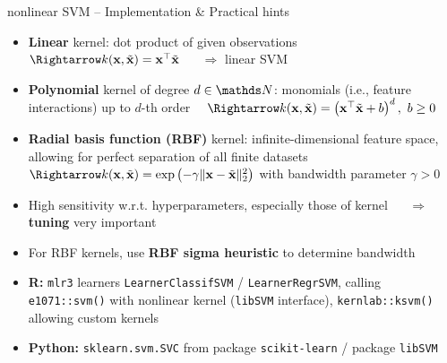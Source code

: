 \begin{frame}{nonlinear SVM -- Implementation \& Practical hints}

\footnotesize


\begin{itemize}
  \item \textbf{Linear} kernel: dot product of given observations ~~ 
  $\Rightarrow \kxxt = \xv^\top \xtil$ ~~ $\Rightarrow$ linear SVM
  \item \textbf{Polynomial} kernel of degree $d \in \N$: monomials (i.e., 
  feature interactions) up to $d$-th 
  order ~~$\Rightarrow 
  \kxxt = \left(\xv^\top \xtil + b \right)^d, ~ b \geq 0$
  \item \textbf{Radial basis function (RBF)} kernel: infinite-dimensional 
  feature space, allowing for perfect separation of all finite 
  datasets ~~ $\Rightarrow \kxxt = \exp \left( -\gamma \| \xv - \xtil \|_2^2 
  \right )$ with 
  bandwidth parameter $\gamma > 0$
\end{itemize}
 
\medskip

 
 \begin{itemize}
  \item High sensitivity w.r.t. hyperparameters, especially those of kernel
  ~~ $\Rightarrow$ \textbf{tuning} very important
  \item For RBF kernels, use \textbf{RBF sigma heuristic} to determine 
  bandwidth
\end{itemize}

  \medskip

\begin{itemize}
  \item \textbf{R:} \texttt{mlr3} learners \texttt{LearnerClassifSVM} /
  \texttt{LearnerRegrSVM}, calling \texttt{e1071::svm()} with nonlinear kernel (\texttt{libSVM} interface),
  \texttt{kernlab::ksvm()} allowing custom kernels
  \item \textbf{Python:} \texttt{sklearn.svm.SVC} from package 
  \texttt{scikit-learn} / package \texttt{libSVM}
\end{itemize}

\end{frame}



